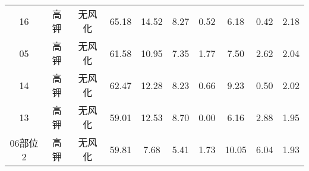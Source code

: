 \documentclass[withoutpreface,bwprint]{cumcmthesis} %
\begin{document}
\begin{appendices}
\begin{table}[!h]
\begin{tabular}{@{}cccccccccc@{}}
		16                                                        & 高钾          & 无风化                                                      & 65.18                                                          & 14.52                                                        & 8.27                                                         & 0.52                                                         & 6.18                                                           & 0.42                                                           & 2.18                                                            \\
		05                                                        & 高钾          & 无风化                                                      & 61.58                                                          & 10.95                                                        & 7.35                                                         & 1.77                                                         & 7.50                                                           & 2.62                                                           & 2.04                                                            \\
		14                                                        & 高钾          & 无风化                                                      & 62.47                                                          & 12.28                                                        & 8.23                                                         & 0.66                                                         & 9.23                                                           & 0.50                                                           & 2.02                                                            \\
		13                                                        & 高钾          & 无风化                                                      & 59.01                                                          & 12.53                                                        & 8.70                                                         & 0.00                                                         & 6.16                                                           & 2.88                                                           & 1.95                                                            \\
		06部位2                                                     & 高钾          & 无风化                                                      & 59.81                                                          & 7.68                                                         & 5.41                                                         & 1.73                                                         & 10.05                                                          & 6.04                                                           & 1.93                                                            \\ \bottomrule

\end{tabular}
\end{table}
\end{appendices}
\end{document}

